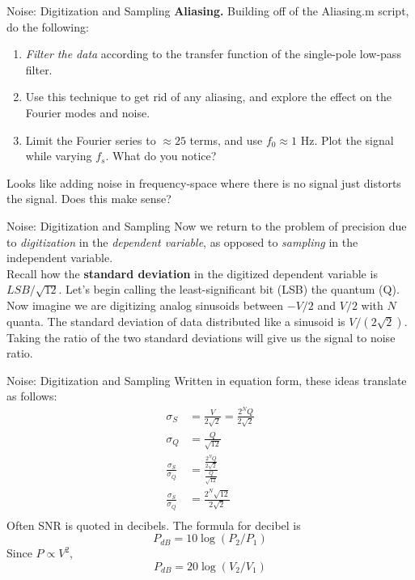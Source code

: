 \documentclass{beamer}
\begin{document}
\begin{frame}{Noise: Digitization and Sampling}
\small
\textbf{Aliasing.} Building off of the Aliasing.m script, do the following:
\begin{enumerate}
\item \textit{Filter the data} according to the transfer function of the single-pole low-pass filter.
\item Use this technique to get rid of any aliasing, and explore the effect on the Fourier modes and noise.
\item Limit the Fourier series to $\approx 25$ terms, and use $f_0 \approx 1$ Hz.  Plot the signal while varying $f_{s}$.  What do you notice?
\end{enumerate}
Looks like adding noise in frequency-space where there is no signal just distorts the signal.  Does this make sense?
\end{frame}

\begin{frame}{Noise: Digitization and Sampling}
Now we return to the problem of precision due to \textit{digitization} in the \textit{dependent variable}, as opposed to \textit{sampling} in the independent variable. \\ \vspace{0.5cm}
Recall how the \textbf{\alert{standard deviation}} in the digitized dependent variable is $LSB/\sqrt{12}$.  Let's begin calling the least-significant bit (LSB) the quantum (Q).  Now imagine we are digitizing analog sinusoids between $-V/2$ and $V/2$ with $N$ quanta.  The standard deviation of data distributed like a sinusoid is $V/(2\sqrt{2})$.  Taking the ratio of the two standard deviations will give us the signal to noise ratio.
\end{frame}

\begin{frame}{Noise: Digitization and Sampling}
\small
Written in equation form, these ideas translate as follows:
\begin{align}
\sigma_{S} &= \frac{V}{2\sqrt{2}} = \frac{2^N Q}{2\sqrt{2}} \\
\sigma_{Q} &= \frac{Q}{\sqrt{12}} \\
\frac{\sigma_S}{\sigma_Q} &= \frac{\frac{2^N Q}{2\sqrt{2}}}{\frac{Q}{\sqrt{12}}} \\
\frac{\sigma_S}{\sigma_Q} &= \frac{2^N \sqrt{12}}{2\sqrt{2}} \label{eq:SNR1} \\
\end{align}
Often SNR is quoted in decibels.  The formula for decibel is 
\begin{equation}
P_{dB} = 10\log(P_2/P_1)
\end{equation}
Since $P \propto V^2$, 
\begin{equation}
P_{dB} = 20\log(V_2/V_1)
\end{equation}
\end{frame}
\end{document}
